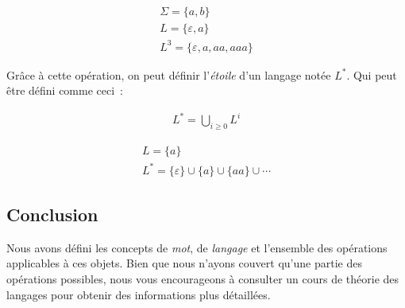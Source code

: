 \begin{example}
    \begin{gather*}
        \Sigma = \{a, b\} \\
        L = \{\varepsilon, a\} \\
        L^3 = \{\varepsilon, a, aa, aaa\}
    \end{gather*}
\end{example}

\begin{definition}
    Grâce à cette opération, on peut définir l'\textit{étoile} d'un langage notée
    \(L^*\). Qui peut être défini comme ceci~:

    \begin{gather*}
        L^* = \bigcup_{i \geq 0} L^i
    \end{gather*}
\end{definition}

\begin{example}
    \begin{gather*}
        L = \{a\} \\
        L^* = \{\varepsilon\} \cup \{a\} \cup \{aa\} \cup \cdots
    \end{gather*}
\end{example}

\subsection{Conclusion}

Nous avons défini les concepts de \textit{mot}, de \textit{langage} et
l'ensemble des opérations applicables à ces objets. Bien que nous n'ayons
couvert qu'une partie des opérations possibles, nous vous encourageons à
consulter un cours de théorie des langages pour obtenir des informations plus
détaillées.